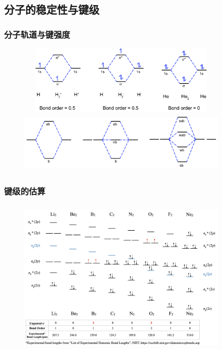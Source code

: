 \subsection{分子的稳定性与键级}
\frame
{
	\frametitle{分子轨道与键强度}
\begin{figure}[h!]
\centering
\vspace{-10.5pt}
\includegraphics[height=1.30in,width=4.00in,viewport=0 0 325 110,clip]{Figures/MO-diagrams_H2He2.png}
\includegraphics[height=1.20in,width=4.00in,viewport=0 0 360 100,clip]{Figures/multi-orbital.png}
\label{MO:H2-He}
\end{figure}
}

\frame
{
	\frametitle{键级的估算}
\begin{figure}[h!]
\centering
\vspace{-10.5pt}
\includegraphics[height=3.00in,width=4.00in,viewport=0 0 1500 1050,clip]{Figures/Band-order.png}
\label{Bond_Order}
\end{figure}
}

